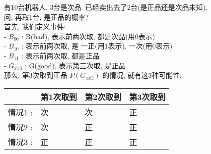 \documentclass[UTF8]{ctexart}
\begin{document}
\begin{myEnvSample}
	有10台机器人, 3台是次品. 已经卖出去了2台(是正品还是次品未知). \\
	问: 再取1台, 是正品的概率? \\
	
	首先, 我们定义事件:  \\
	- $B_{00}$ : B(bad),  表示前两次取, 都是次品(用0表示) \\
	- $B_{10}$ : 表示前两次取, 是 一正(用1表示), 一次(用0表示) \\
	- $B_{11}$ : 表示前两次取, 都是正品 \\
	- $G_{xx3}$ : G(good),  表示第三次取, 是正品 \\
	
	那么, 第3次取到正品 $P(G_{xx3})$ 的情况, 就有这3种可能性: \\
	\begin{tabular}{|l|l|l|l|}
		\hline
		& 第1次取到           & 第2次取到 & 第3次取到  \\
		\hline
		情况1 : & 次 & 次     & 正      \\
		\hline
		情况2 : & 次               & 正     & 正      \\
		\hline
		情况3 : & 正               & 正     & 正       \\
		\hline
	\end{tabular}

	
	


\end{myEnvSample}













	
	
	
	
\end{document}

